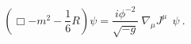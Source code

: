 \begin{equation}
(\Box-m^2-\frac{1}{6}R)\psi=\frac{i\phi^{-2}}{\sqrt{-g}}~\nabla_{\mu}J^{\mu}~~\psi~.
\end{equation}

